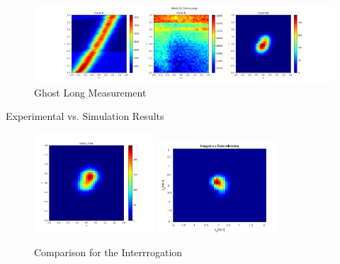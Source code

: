 \documentclass[xcolor=dvipsnames]{beamer}
\begin{document}
\begin{frame}
\begin{figure}
\includegraphics[width=1.1\textwidth]{pictures/Ghost_P2_Toma_Larga.png}
\caption{Ghost Long Measurement}
\end{figure}
\end{frame}
\begin{frame}{Experimental vs. Simulation Results}
\begin{figure}
 \centering

{  \includegraphics[width=0.4\textwidth]{pictures/Ghost_Inter.png} }
{  \includegraphics[width=0.4\textwidth]{pictures/ImagenS1.png} }
\caption{Comparison for the Interrrogation}
 \label{n1}
\end{figure}
\end{frame}
\end{document}
